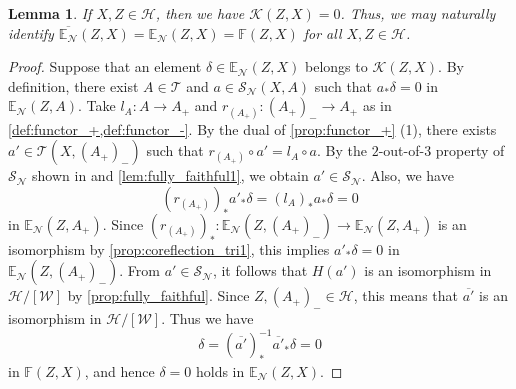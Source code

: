 \documentclass[a4paper,reqno,10pt]{amsart}
\newtheorem{lemma}[lemma]{Lemma}
\theoremstyle{definition}
\theoremstyle{definition}
\theoremstyle{definition}
\theoremstyle{definition}
\theoremstyle{plain}
\newcommand{\BE}{\mathbb{E}}
\newcommand{\BF}{\mathbb{F}}
\newcommand{\CH}{\mathcal{H}}
\newcommand{\CK}{\mathcal{K}}
\newcommand{\CN}{\mathcal{N}}
\newcommand{\CT}{\mathcal{T}}
\newcommand{\CW}{\mathcal{W}}
\renewcommand{\SS}{\mathscr{S}}
\begin{document}
\begin{lemma}\label{lem:equalF}
If $X,Z\in\CH$, then we have $\CK(Z,X)=0$. Thus, we may naturally identify $\overline{\BE_{\CN}}(Z,X)=\BE_{\CN}(Z,X)=\BF(Z,X)$ for all $X,Z\in\CH$.
\end{lemma}
\begin{proof}
Suppose that an element $\delta\in\BE_{\CN}(Z,X)$ belongs to $\CK(Z,X)$. By definition, there exist $A\in\CT$ and $a\in\SS_{\CN}(X,A)$ such that $a_{\ast}\delta=0$ in $\BE_{\CN}(Z,A)$.
Take $l_A\colon A\to A_+$ and $r_{(A_+)}\colon (A_+)_-\to A_+$ as in \cref{def:functor_+,def:functor_-}. 
By the dual of \cref{prop:functor_+} {\rm (1)}, there exists $a'\in\CT(X,(A_+)_-)$ such that $r_{(A_+)}\circ a'=l_A\circ a$.
By the $2$-out-of-$3$ property of $\SS_{\CN}$ shown in \cite[Corollary~2.18]{Oga24} and \cref{lem:fully_faithful1}, we obtain $a'\in\SS_{\CN}$.
Also, we have
\[
(r_{(A_+)})_{\ast}a'_{\ast}\delta=(l_A)_{\ast}a_{\ast}\delta=0
\]
in $\BE_{\CN}(Z,A_+)$.
Since $(r_{(A_+)})_{\ast}\colon\BE_{\CN}(Z,(A_+)_-)\to \BE_{\CN}(Z,A_+)$ is an isomorphism by \cref{prop:coreflection_tri1}, this implies $a'_{\ast}\delta=0$ in $\BE_{\CN}(Z,(A_+)_-)$.
From $a'\in\SS_{\CN}$, it follows that $H(a')$ is an isomorphism in $\CH/[\CW]$ by \cref{prop:fully_faithful}.
Since $Z,(A_+)_-\in\CH$, this means that $\overline{a'}$ is an isomorphism in $\CH/[\CW]$.
Thus we have
\[
\delta=(\overline{a'})^{-1}_{\ast}\overline{a'}_{\ast}\delta=0
\]
in $\BF(Z,X)$, and hence $\delta=0$ holds in $\BE_{\CN}(Z,X)$.
\end{proof}
\end{document}
